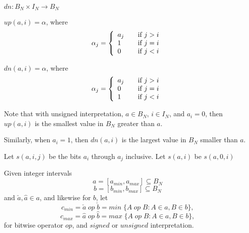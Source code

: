 \documentclass{article}
\begin{document}
$dn : B_N \times I_N \rightarrow B_N$

$up(a,i) = \alpha$, where
\begin{equation*}
    \alpha_j = \left\{
    \begin{array}{l l}
    a_j & \quad \text{if $j > i$}\\
    1 & \quad \text{if $j = i$}\\
    0 & \quad \text{if $j < i$}\\
    \end{array}\right.
\end{equation*}

$dn(a,i) = \alpha$, where
\begin{equation*}
    \alpha_j = \left\{
    \begin{array}{l l}
    a_j & \quad \text{if $j > i$}\\
    0 & \quad \text{if $j = i$}\\
    1 & \quad \text{if $j < i$}\\
    \end{array}\right.
\end{equation*}

Note that with unsigned interpretation, $a \in B_N$, $i \in I_N$,
and $a_i = 0$, then $up(a,i)$ is the smallest value in $B_N$ greater
than $a$.

Similarly, when $a_i = 1$, then $dn(a,i)$ is the largest value in 
$B_N$ smaller than $a$.

\vspace{10pt}

Let $s(a,i,j)$ be the bits $a_{i}$ through $a_{j}$ inclusive.
Let $s(a,i)$ be $s(a,0,i)$

\vspace{10pt}

Given integer intervals 
\begin{equation*}
a = [a_{min},a_{max}] \subseteq B_N
\end{equation*} 
\begin{equation*}
b = [b_{min},b_{max}] \subseteq B_N
\end{equation*} 
and $\check a, \hat a \in a$, and likewise for $b$, 
let
\begin{equation*}c_{min} = \check a \; op \; \check b = min \; \{A \; op \; B :A \in a, B \in b\},\end{equation*} 
\begin{equation*}c_{max} = \hat a \; op \; \hat b = max \; \{A \; op \; B :A \in a, B \in b\}, \end{equation*}
for bitwise operator $op$, and $signed$ or $unsigned$ interpretation.
\end{document}
